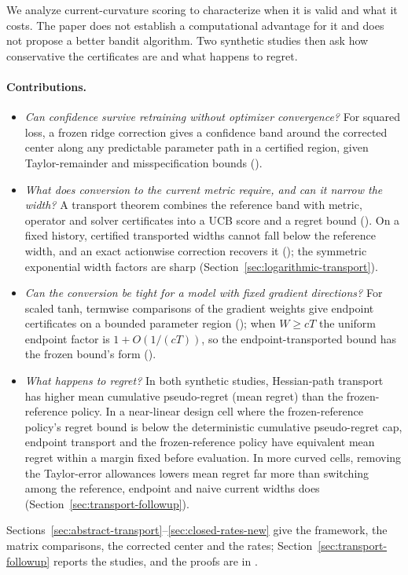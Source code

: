 We analyze current-curvature scoring to characterize when it is valid and what
it costs. The paper does not establish a computational advantage for it and
does not propose a better bandit algorithm. Two synthetic studies then ask how
conservative the certificates are and what happens to regret.

\paragraph{Contributions.}
\begin{itemize}[leftmargin=*,itemsep=2pt,topsep=2pt]
\item \emph{Can confidence survive retraining without optimizer convergence?}
For squared loss, a frozen ridge correction gives a confidence band around the
corrected center along any predictable parameter path in a certified region,
given Taylor-remainder and misspecification bounds
().
\item \emph{What does conversion to the current metric require, and can it
narrow the width?} A transport theorem combines the reference band with metric,
operator and solver certificates into a UCB score and a regret bound
(). On a fixed history, certified transported widths
cannot fall below the reference width, and an exact actionwise correction
recovers it (); the symmetric exponential
width factors are sharp (Section~\ref{sec:logarithmic-transport}).
\item \emph{Can the conversion be tight for a model with fixed gradient
directions?} For scaled tanh, termwise comparisons of the gradient weights give
endpoint certificates on a bounded parameter region
(); when $W\ge cT$
the uniform endpoint factor is $1+O(1/(cT))$, so the endpoint-transported bound
has the frozen bound's form ().
\item \emph{What happens to regret?} In both synthetic studies,
Hessian-path transport has higher mean cumulative pseudo-regret (mean regret)
than the frozen-reference policy. In a near-linear design cell where the
frozen-reference policy's regret bound is below the deterministic cumulative
pseudo-regret cap, endpoint transport and the frozen-reference policy have
equivalent mean regret within a margin fixed before evaluation. In more curved
cells, removing the Taylor-error allowances lowers mean regret far more than
switching among the reference, endpoint and naive current widths does (Section~\ref{sec:transport-followup}).
\end{itemize}
Sections~\ref{sec:abstract-transport}--\ref{sec:closed-rates-new} give the
framework, the matrix comparisons, the corrected center and the rates;
Section~\ref{sec:transport-followup} reports the studies, and the proofs are in
.
